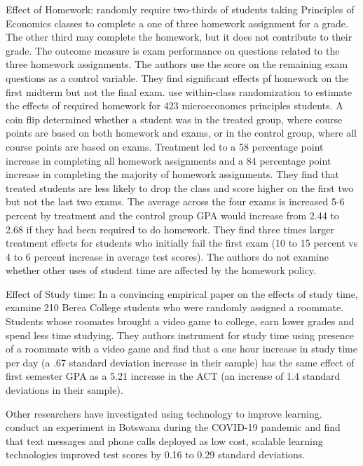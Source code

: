 \documentclass[12pt]{article}
\begin{document}
Effect of Homework: \textcite{ts2012} randomly require two-thirds of students taking Principles of Economics classes to complete a one of three homework assignment for a grade. The other third may complete the homework, but it does not contribute to their grade. The outcome measure is exam performance on questions related to the three homework assignments. The authors use the score on the remaining exam questions as a control variable. They find significant effects pf homework on the first midterm but not the final exam. \textcite{gr2013} use within-class randomization to estimate the effects of required homework for 423 microeconomcs principles students. A coin flip determined whether a student was in the treated group, where course points are based on both homework and exams, or in the control group, where all course points are based on exams. Treatment led to a 58 percentage point increase in completing all homework assignments and a 84 percentage point increase in completing the majority of homework assignments. They find that treated students are less likely to drop the class and score higher on the first two but not the last two exams. The average across the four exams is increased 5-6 percent by treatment and the control group GPA would increase from 2.44 to 2.68 if they had been required to do homework. They find three times larger treatment effects for students who initially fail the first exam (10 to 15 percent vs 4 to 6 percent increase in average test scores). The authors do not examine whether other uses of student time are affected by the homework policy.

Effect of Study time: In a convincing empirical paper on the effects of study time, \textcite{ss2008} examine 210 Berea College students who were randomly assigned a roommate. Students whose roomates brought a video game to college, earn lower grades and spend less time studying. They authors instrument for study time using presence of a roommate with a video game and find that a one hour increase in study time per day (a .67 standard deviation increase in their sample) has the same effect of first semester GPA as a 5.21 increase in the ACT (an increase of 1.4 standard deviations in their sample).

Other researchers have investigated using technology to improve learning. \textcite{nbbm2020} conduct an experiment in Botswana during the COVID-19 pandemic and find that text messages and phone calls deployed as low cost, scalable learning technologies improved test scores by 0.16 to 0.29 standard deviations.
\end{document}
